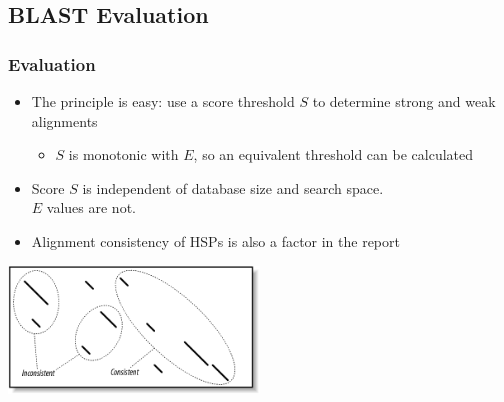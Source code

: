 %

\subsection{BLAST Evaluation}
\begin{frame}
  \frametitle{Evaluation}
  \begin{itemize}
    \item The principle is easy: use a score threshold $S$ to determine strong and weak alignments
    \begin{itemize}
      \item $S$ is monotonic with $E$, so an equivalent threshold can be calculated
    \end{itemize}
    \item Score $S$ is independent of database size and search space. \\ $E$ values are not.
    \item Alignment consistency of HSPs is also a factor in the report
  \end{itemize}
  \begin{center}
    \includegraphics[width=0.5\textwidth]{images/consistency} 
  \end{center}    
\end{frame}
